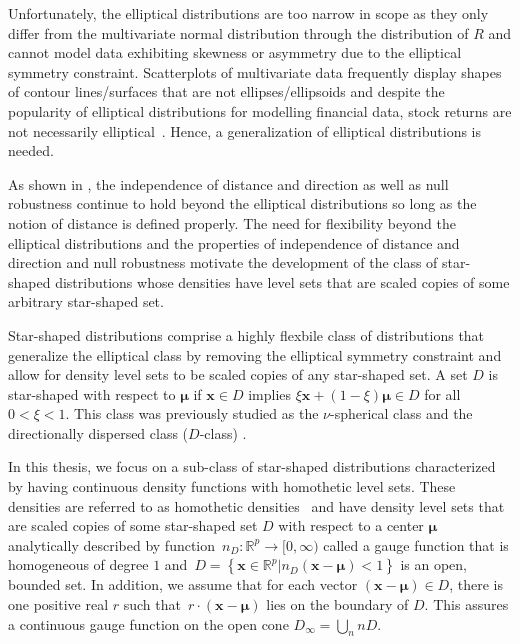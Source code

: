 \documentclass[]{article}
\numberwithin{equation}{section}
\newcommand{\fnc}[2]{#1\!\paren{#2}} %
\newcommand{\mub}{\bm{{\mu}}} %
\newcommand{\nf}{\infty} %
\newcommand{\paren}[1]{\left( #1 \right)} %
\newcommand{\R}{\mathbb{R}} %
\newcommand{\set}[1]{\left\{ #1 \right\}} %
\newcommand{\xb}{\mathbf{x}}
\begin{document}
Unfortunately, the elliptical distributions are too narrow in scope as they only differ from the multivariate normal distribution through the distribution of \(R\) and cannot model data exhibiting skewness or asymmetry due to the elliptical symmetry constraint. Scatterplots of multivariate data frequently display shapes of contour lines/surfaces that are not ellipses/ellipsoids \citep{Liebscher2020} and despite the popularity of elliptical distributions for modelling financial data, stock returns are not necessarily \mbox{elliptical \citep{Chicheportiche2012}}. Hence, a generalization of elliptical distributions is needed.

As shown in \citet{Kamiya2008}, the independence of distance and direction as well as null robustness continue to hold beyond the elliptical distributions so long as the notion of distance is defined properly. The need for flexibility beyond the elliptical distributions and the properties of independence of distance and direction and null robustness motivate the development of the class of star-shaped distributions whose densities have level sets that are scaled copies of some arbitrary star-shaped set.

Star-shaped distributions \citep{Kamiya2008} comprise a highly flexbile class of distributions that generalize the elliptical class by removing the elliptical symmetry constraint and allow for density level sets to be scaled copies of any star-shaped set. A set \(D\) is star-shaped with respect to \(\mub\) if \(\xb\in D\) implies \(\xi\xb + \paren{1-\xi}\mub \in D\) for all \(0 < \xi < 1\). This class was previously studied as the \(\nu\)-spherical class \citep{Fernandez1995} and the directionally dispersed class (\(D\)-class) \citep{Ferreira2005}.

In this thesis, we focus on a sub-class of star-shaped distributions characterized by having continuous density functions with homothetic level sets. These densities are referred to as homothetic \mbox{densities \citep{Balkema2010}} and have density level sets that are scaled copies of some star-shaped set \(D\) with respect to a center \(\mub\) analytically described by \mbox{function $n_D:\R^p \to [0, \nf)$} called a gauge function that is homogeneous of degree \(1\) \mbox{and $D = \set{\xb \in \R^p | \fnc{n_D}{\xb - \mub} < 1}$} is an open, bounded set. In addition, we assume that for each vector \mbox{$\paren{\xb-\mub} \in D$}, there is one positive real \(r\) such \mbox{that $r\cdot\paren{\xb-\mub}$} lies on the boundary of \(D\). This assures a continuous gauge function on the open cone \(D_{\nf} = \bigcup_n nD\).
\end{document}
